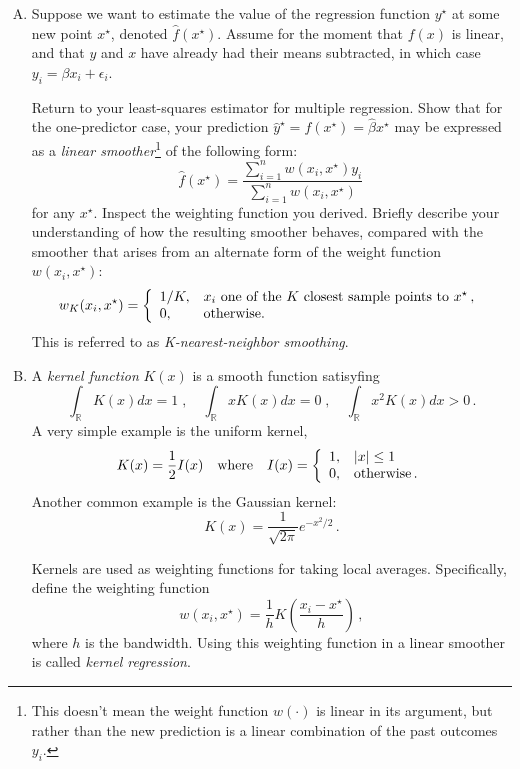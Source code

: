 \documentclass{mynotes}
\begin{document}
\begin{enumerate}[(A)]
\item Suppose we want to estimate the value of the regression function $y^{\star}$ at some new point $x^\star$, denoted $\hat{f}(x^{\star})$.  Assume for the moment that $f(x)$ is linear, and that $y$ and $x$ have already had their means subtracted, in which case $y_i = \beta x_i + \epsilon_i$.

Return to your least-squares estimator for multiple regression.  Show that for the one-predictor case, your prediction $\hat{y}^{\star} = f(x^{\star}) = \hat{\beta} x^{\star}$ may be expressed as a \textit{linear smoother}\footnote{This doesn't mean the weight function $w(\cdot)$ is linear in its argument, but rather than the new prediction is a linear combination of the past outcomes $y_i$.} of the following form:
$$
\hat{f}(x^{\star}) = \frac{\sum_{i=1}^n w(x_i, x^{\star}) y_i }{\sum_{i=1}^n w(x_i, x^{\star})}  \, 
$$
for any $x^{\star}$.  Inspect the weighting function you derived.  Briefly describe your understanding of how the resulting smoother behaves, compared with the smoother that arises from an alternate form of the weight function $w(x_i, x^{\star})$:
$$
w_K(x_i, x^{\star}) = \left \{
\begin{array}{l l}
1/K, & \mbox{$x_i$ one of the $K$ closest sample points to $x^{\star}$} \, ,\\
0, & \mbox{otherwise.} \\
\end{array}
\right.
$$
This is referred to as \textit{K-nearest-neighbor smoothing}.

\item A \textit{kernel function} $K(x)$ is a smooth function satisyfing
$$
\int_\mathbb{R} K(x) dx = 1 \; , \quad \int_\mathbb{R} x K(x) dx = 0 \; , \quad \int_\mathbb{R} x^2 K(x) dx > 0 \, .
$$
A very simple example is the uniform kernel,
$$
K(x) = \frac{1}{2} I(x) \quad \mbox{where} \quad I(x) = 
\left\{
\begin{array}{l l}
1, & |x| \leq 1 \\
0, & \mbox{otherwise} \, . \\
\end{array}
\right.
$$
Another common example is the Gaussian kernel:
$$
K(x) = \frac{1}{\sqrt{2 \pi}} e^{-x^2/2} \, .
$$

Kernels are used as weighting functions for taking local averages.  Specifically, define the weighting function
$$
w(x_i, x^{\star}) = \frac{1}{h} K \left( \frac{x_i - x^{\star}}{h} \right)  \, ,
$$
where $h$ is the bandwidth.    Using this weighting function in a linear smoother is called \textit{kernel regression}.


\end{enumerate}
\end{document}
